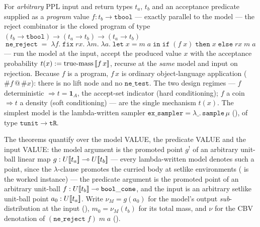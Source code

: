 \begin{definition}\label{def:cbv-ex-reject-comb}
\rocqok
{}\rocqok
{}
For \emph{arbitrary} PPL input and return types $t_a$, $t_b$ and an
acceptance predicate supplied as a \emph{program} value
$f : t_b \to \mathtt{tbool}$ --- exactly parallel to the model --- the
reject combinator is the closed program of type
$(t_b \to \mathtt{tbool}) \to (t_a \to t_b) \to (t_a \to t_b)$
\[
  \mathtt{ne\_reject}
  \;=\;
  \lambda f.\;\mathtt{fix}\;\textit{rx}.\;\lambda m.\;\lambda a.\;
    \mathtt{let}\;x = m\;a\;\mathtt{in}\;
    \mathtt{if}\;(f\;x)\;
    \mathtt{then}\;x\;
    \mathtt{else}\;\textit{rx}\;m\;a
\]
--- run the model at the input, accept the produced value $x$ with the
acceptance probability $t(x) := \mathrm{true\text{-}mass}\,[\![ f\,x ]\!]$,
recurse at the \emph{same} model and input on rejection. Because $f$ is a
program, $f\,x$ is ordinary object-language application ($\#f\,@\,\#x$):
there is no lift node and no $\mathtt{ne\_test}$. The two design regimes
--- $f$ deterministic $\Rightarrow t = \mathbf 1_A$, the accept-set
indicator (hard conditioning); $f$ a coin $\Rightarrow t$ a density
(soft conditioning) --- are the single mechanism $t(x)$. The simplest
model is the lambda-written sampler
$\mathtt{ex\_sampler} = \lambda\_.\,\mathtt{sample}\,\mu$
(), of type
$\mathtt{tunit} \to \mathtt{tR}$.

The theorems quantify over the model VALUE, the predicate VALUE and the
input VALUE: the model argument is the promoted point $g^!$ of an
arbitrary unit-ball linear map $g : U[\![ t_a ]\!] \multimap U[\![ t_b ]\!]$ ---
every lambda-written model denotes such a point, since the
$\lambda$-clause promotes the curried body at setlike environments
( is the worked
instance) --- the predicate argument is the promoted point of an
arbitrary unit-ball $f : U[\![ t_b ]\!] \multimap \mathtt{bool\_cone}$, and
the input is an arbitrary setlike unit-ball point
$a_0 : U[\![ t_a ]\!]$. Write
$\nu_M = g(a_0)$ for the model's output \emph{sub}-distribution at
the input (),
$m_0 = \nu_M(t_b)$ for its total mass, and $\nu$ for the
CBV denotation of $(\mathtt{ne\_reject}\;f)\;m\;a$
().
\end{definition}

